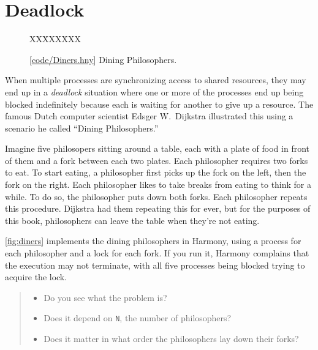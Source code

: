 \documentclass{report}
\newcommand{\harmonysource}[1]{
\begin{tabbing}
XX\=XXX\=XXX\kill
    
\end{tabbing}
}
\newcommand{\harmonylink}[1]{%
[\href{https://www.cs.cornell.edu/home/rvr/harmony/#1}{\underline{#1}}]%
}
\newenvironment{code}{
\tcolorbox
}{
\endtcolorbox
}
\begin{document}
\chapter{Deadlock}
\label{ch:deadlock}
%

%

\begin{figure}
\begin{code}
\harmonysource{Diners}
\end{code}
\caption{\harmonylink{code/Diners.hny} Dining Philosophers.}
\label{fig:diners}
\end{figure}

When multiple processes are synchronizing access to shared resources, they
may end up in a \emph{deadlock} situation where one or more of the processes
end up being blocked indefinitely because each is waiting for another to give
up a resource.
The famous Dutch computer scientist Edsger W.~Dijkstra illustrated this using
a scenario he called ``Dining Philosophers.''
%

Imagine five philosopers sitting around a table, each with a plate of food in
front of them and a fork between each two plates.  Each philosopher requires
two forks to eat.  To start eating, a philosopher first picks up the fork on
the left, then the fork on the right.  Each philosopher likes to take breaks
from eating to think for a while.  To do so, the philosopher puts down both
forks.  Each philosopher repeats this procedure.  Dijkstra had them repeating
this for ever, but for the purposes of this book, philosophers can leave
the table when they're not eating.

\autoref{fig:diners} implements the dining philosophers in Harmony, using a
process for each philosopher and a lock for each fork.  If you
run it, Harmony complains that the execution may not terminate, with all five
processes being blocked trying to acquire the lock.

\begin{quote}
\begin{itemize}
\item Do you see what the problem is?
\item Does it depend on \texttt{N}, the number of philosophers?
\item Does it matter in what order the philosophers lay down their forks?
\end{itemize}
\end{quote}

\end{document}
